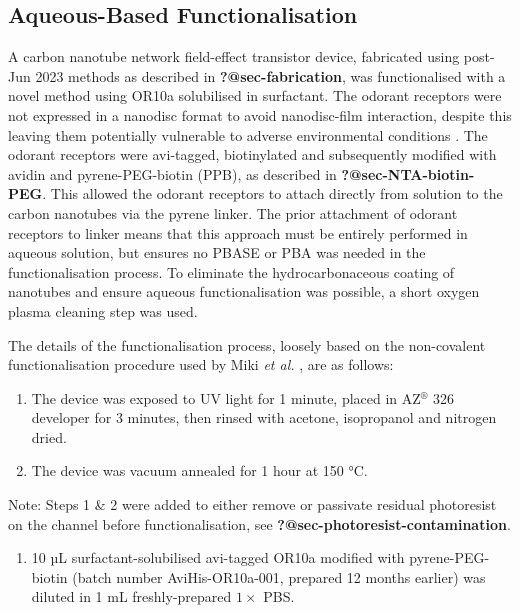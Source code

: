 \documentclass[
  a4paper,
]{scrbook}
\providecommand{\tightlist}{%
  \setlength{\itemsep}{0pt}\setlength{\parskip}{0pt}}\usepackage{longtable,booktabs,array}
\begin{document}
\hypertarget{sec-aqueous-functionalisation}{%
\subsection{Aqueous-Based
Functionalisation}\label{sec-aqueous-functionalisation}}

A carbon nanotube network field-effect transistor device, fabricated
using post-Jun 2023 methods as described in \textbf{?@sec-fabrication},
was functionalised with a novel method using OR10a solubilised in
surfactant. The odorant receptors were not expressed in a nanodisc
format to avoid nanodisc-film interaction, despite this leaving them
potentially vulnerable to adverse environmental conditions
\autocite{Nath2007,Bayburt2010}. The odorant receptors were avi-tagged,
biotinylated and subsequently modified with avidin and pyrene-PEG-biotin
(PPB), as described in \textbf{?@sec-NTA-biotin-PEG}. This allowed the
odorant receptors to attach directly from solution to the carbon
nanotubes via the pyrene linker. The prior attachment of odorant
receptors to linker means that this approach must be entirely performed
in aqueous solution, but ensures no PBASE or PBA was needed in the
functionalisation process. To eliminate the hydrocarbonaceous coating of
nanotubes and ensure aqueous functionalisation was possible, a short
oxygen plasma cleaning step was used.

The details of the functionalisation process, loosely based on the
non-covalent functionalisation procedure used by Miki \emph{et al.}
\autocite{Miki2019}, are as follows:

\begin{enumerate}
\def\labelenumi{\arabic{enumi}.}
\item
  The device was exposed to UV light for 1 minute, placed in
  AZ\(^\circledR\) 326 developer for 3 minutes, then rinsed with
  acetone, isopropanol and nitrogen dried.
\item
  The device was vacuum annealed for 1 hour at 150 °C.
\end{enumerate}

Note: Steps 1 \& 2 were added to either remove or passivate residual
photoresist on the channel before functionalisation, see
\textbf{?@sec-photoresist-contamination}.

\begin{enumerate}
\def\labelenumi{\arabic{enumi}.}
\setcounter{enumi}{2}
\tightlist
\item
  10 µL surfactant-solubilised avi-tagged OR10a modified with
  pyrene-PEG-biotin (batch number AviHis-OR10a-001, prepared 12 months
  earlier) was diluted in 1 mL freshly-prepared \(1 \times\) PBS.
\end{enumerate}
\end{document}
